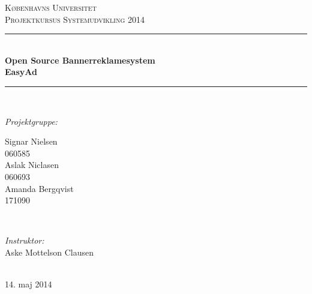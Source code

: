 \documentclass[a4paper,12pt]{article}
\begin{document}
\begin{titlepage}


\newcommand{\HRule}{\rule{\linewidth}{0.5mm}} %

\center %

\textsc{\LARGE Københavns Universitet}\\[1.5cm] %
\textsc{\Large Projektkursus Systemudvikling 2014}\\[0.5cm] %

\HRule \\[0.4cm]
{  \bfseries \large Open Source Bannerreklamesystem \\ \huge EasyAd}\\[0.4cm] %
\HRule \\[1.5cm]

\begin{minipage}[t]{0.4\textwidth}
\begin{flushleft} \large
\emph{Projektgruppe:}


Signar Nielsen %
\\
060585
\newline
\\
Aslak Niclasen
\\
060693
\newline
\\
Amanda Bergqvist
\\
171090
\end{flushleft}
\end{minipage}
~
\begin{minipage}[t]{0.4\textwidth}
\begin{flushright} \large
\emph{Instruktor:} \\
Aske Mottelson Clausen %
\end{flushright}
\end{minipage}\\[4cm]

{\large 14. maj 2014}\\[3cm] %

\end{titlepage}

\tableofcontents %


\clearpage %
\end{document}
